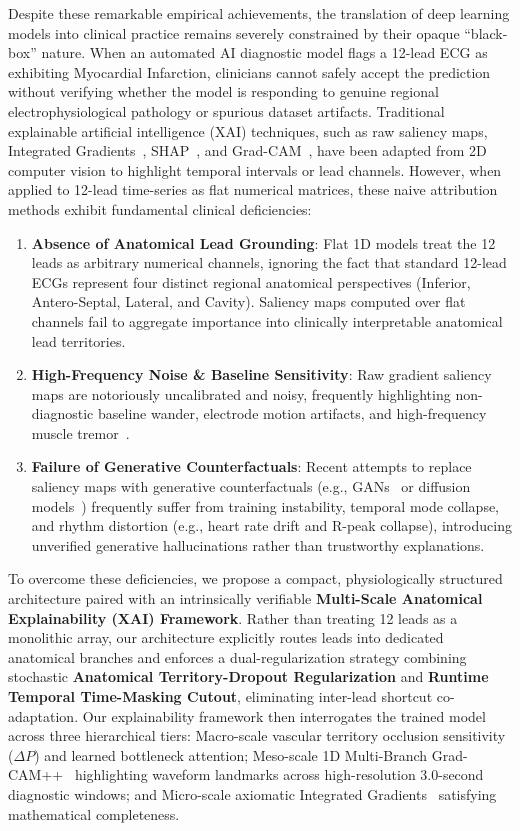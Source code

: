 \documentclass[5p,twocolumn,10pt]{elsarticle}
\begin{document}
Despite these remarkable empirical achievements, the translation of deep learning models into clinical practice remains severely constrained by their opaque ``black-box'' nature. When an automated AI diagnostic model flags a 12-lead ECG as exhibiting Myocardial Infarction, clinicians cannot safely accept the prediction without verifying whether the model is responding to genuine regional electrophysiological pathology or spurious dataset artifacts. Traditional explainable artificial intelligence (XAI) techniques, such as raw saliency maps, Integrated Gradients~\cite{sundararajan2017axiomatic}, SHAP~\cite{lundberg2017unified}, and Grad-CAM~\cite{selvaraju2017grad}, have been adapted from 2D computer vision to highlight temporal intervals or lead channels. However, when applied to 12-lead time-series as flat numerical matrices, these naive attribution methods exhibit fundamental clinical deficiencies:
\begin{enumerate}
    \item \textbf{Absence of Anatomical Lead Grounding}: Flat 1D models treat the 12 leads as arbitrary numerical channels, ignoring the fact that standard 12-lead ECGs represent four distinct regional anatomical perspectives (Inferior, Antero-Septal, Lateral, and Cavity). Saliency maps computed over flat channels fail to aggregate importance into clinically interpretable anatomical lead territories.
    \item \textbf{High-Frequency Noise \& Baseline Sensitivity}: Raw gradient saliency maps are notoriously uncalibrated and noisy, frequently highlighting non-diagnostic baseline wander, electrode motion artifacts, and high-frequency muscle tremor~\cite{ismail2020benchmarking, tonekaboni2020went}.
    \item \textbf{Failure of Generative Counterfactuals}: Recent attempts to replace saliency maps with generative counterfactuals (e.g., GANs~\cite{korkmaz2021deep} or diffusion models~\cite{neifar2024diffecg}) frequently suffer from training instability, temporal mode collapse, and rhythm distortion (e.g., heart rate drift and R-peak collapse), introducing unverified generative hallucinations rather than trustworthy explanations.
\end{enumerate}

To overcome these deficiencies, we propose a compact, physiologically structured architecture paired with an intrinsically verifiable \textbf{Multi-Scale Anatomical Explainability (XAI) Framework}. Rather than treating 12 leads as a monolithic array, our architecture explicitly routes leads into dedicated anatomical branches and enforces a dual-regularization strategy combining stochastic \textbf{Anatomical Territory-Dropout Regularization} and \textbf{Runtime Temporal Time-Masking Cutout}, eliminating inter-lead shortcut co-adaptation. Our explainability framework then interrogates the trained model across three hierarchical tiers: Macro-scale vascular territory occlusion sensitivity ($\Delta P$) and learned bottleneck attention; Meso-scale 1D Multi-Branch Grad-CAM++~\cite{chattopadhay2018grad} highlighting waveform landmarks across high-resolution 3.0-second diagnostic windows; and Micro-scale axiomatic Integrated Gradients~\cite{sundararajan2017axiomatic} satisfying mathematical completeness.
\end{document}
